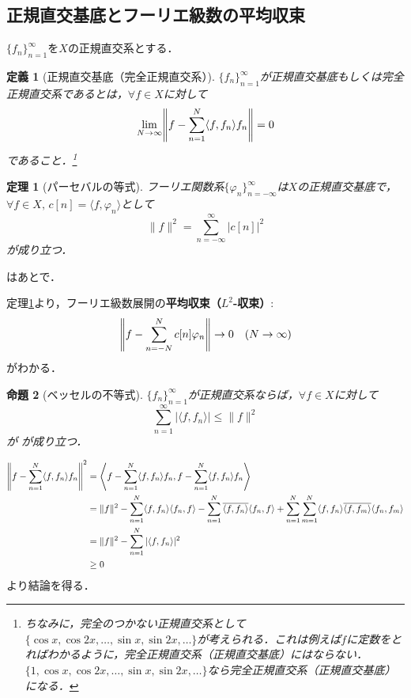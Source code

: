 \documentclass[dvipdfmx,a4j,10pt]{jsarticle}
\makeatletter
\theoremstyle{mystyle1}
\newtheorem{theorem}{定理}[section]
\newtheorem{proposition}[theorem]{命題}
\theoremstyle{mystyle3}
\theoremstyle{mystyle4}
\theoremstyle{mystyle6}
\theoremstyle{mystyle2}
\newtheorem{dfn*}{定義}
\theoremstyle{mystyle5}
\renewenvironment{proof}[1][\proofname]{\par
  \pushQED{\qed}%
  \normalfont
  \topsep6\p@\@plus6\p@ \trivlist
  \item[\hskip\labelsep{\bfseries\sffamily #1}]\ignorespaces
}{%
  \popQED\endtrivlist\@endpefalse
}
\renewcommand\proofname{証明}
\newenvironment{prop}[1][]
{\begin{tcolorbox}[
    enhanced,
    boxrule=0pt,
    arc=0mm,
    frame hidden,
    borderline west={2pt}{-4pt}{blue!50!black},
    breakable = true
    ]
    \begin{proposition}[#1]
}
{\end{proposition}\end{tcolorbox}}
\newenvironment{thm}[1][]
{\begin{tcolorbox}[
    enhanced,
    boxrule=0pt,
    arc=0mm,
    frame hidden,
    borderline west={2pt}{-4pt}{red},
    breakable = true
    ]
    \begin{theorem}[#1]
}
{\end{theorem}\end{tcolorbox}}
\makeatother
\begin{document}
\subsection{正規直交基底とフーリエ級数の平均収束}
$\{f_n\}_{n=1}^\infty$を$X$の正規直交系とする．
\begin{dfn*}[正規直交基底（完全正規直交系）]
	$\{f_n\}_{n=1}^\infty$が正規直交基底もしくは完全正規直交系であるとは，$\forall f\in X$に対して
	\[
		\lim_{N\to\infty} \mleft\|f-\sum_{n=1}^N \langle f,f_n\rangle f_n\mright\|=0
	\]
	であること．\footnote{
		ちなみに，完全のつかない正規直交系として$\{\cos x,\cos 2x,\ldots,\sin x,\sin 2x,\ldots\}$が考えられる．これは例えば$f$に定数をとればわかるように，完全正規直交系（正規直交基底）にはならない．$\{1,\cos x,\cos 2x,\ldots,\sin x,\sin 2x,\ldots\}$なら完全正規直交系（正規直交基底）になる．
	}
\end{dfn*}

\begin{thm}[パーセバルの等式]\label{thm:1-6}
	フーリエ関数系$\{\varphi_n\}_{n=-\infty}^\infty$は$X$の正規直交基底で，$\forall f\in X,\, c[n]=\langle f,\varphi_n\rangle$として
	\begin{equation}\label{eq:1-20}
		\|f\|^2=\sum_{n=-\infty}^\infty |c[n]|^2
	\end{equation}
	が成り立つ．
\end{thm}
\begin{proof}
	はあとで．
\end{proof}

定理\ref{thm:1-6}より，フーリエ級数展開の\textbf{平均収束（$L^2$-収束）}:
\[
	\mleft\|f-\sum_{n=-N}^N c[n]\varphi_n\mright\|\to 0\quad(N\to\infty)
\]
がわかる．

\begin{prop}[ベッセルの不等式]\label{prop:1-7}
	$\{f_n\}_{n=1}^\infty$が正規直交系ならば，$\forall f\in X$に対して
	\begin{equation}\label{eq:1-22}
		\sum_{n=1}^\infty |\langle f,f_n\rangle|\leq \|f\|^2
	\end{equation}が
	が成り立つ．
\end{prop}

\begin{proof}
	\[
		\begin{split}
			\mleft\|f-\sum_{n=1}^N\langle f,f_n\rangle f_n\mright\|^2
			&= \mleft\langle f-\sum_{n=1}^N\langle f,f_n\rangle f_n, f-\sum_{n=1}^N\langle f,f_n\rangle f_n\mright\rangle \\
			&=\|f\|^2-\sum_{n=1}^N\langle f,f_n\rangle\langle f_n,f\rangle-\sum_{n=1}^N\overline{\langle f,f_n\rangle}\langle f_n,f\rangle+\sum_{n=1}^N\sum_{m=1}^N\langle f,f_n\rangle\overline{\langle f,f_m\rangle}\langle f_n,f_m\rangle \\
			&=\|f\|^2-\sum_{n=1}^N|\langle f,f_n\rangle|^2 \\
			&\geq 0
		\end{split}
	\]
	より結論を得る．
\end{proof}
\end{document}
